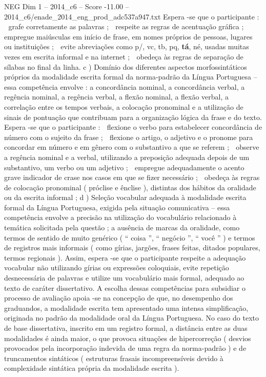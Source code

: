 \begin{textsample}{NEG Dim 1 – 2014\_c6 – Score -11.00 – 2014\_c6/enade\_2014\_eng\_prod\_adc537a947.txt}
Espera -se que o participante :  grafe corretamente as palavras ;  respeite as regras de acentuação gráfica ;  empregue maiúsculas em início de frase, em nomes próprios de pessoas, lugares ou instituições ;  evite abreviações como p/, vc, tb, pq, \textbf{tá}, né, usadas muitas vezes em escrita informal e na internet ;  obedeça às regras de separação de sílabas no final da linha. c ) Domínio dos diferentes aspectos morfossintáticos próprios da modalidade escrita formal da norma-padrão da Língua Portuguesa – essa competência envolve : a concordância nominal, a concordância verbal, a regência nominal, a regência verbal, a flexão nominal, a flexão verbal, a correlação entre os tempos verbais, a colocação pronominal e a utilização de sinais de pontuação que contribuam para a organização lógica da frase e do texto.
Espera -se que o participante :  flexione o verbo para estabelecer concordância de número com o sujeito da frase ;  flexione o artigo, o adjetivo e o pronome para concordar em número e em gênero com o substantivo a que se referem ;  observe a regência nominal e a verbal, utilizando a preposição adequada depois de um substantivo, um verbo ou um adjetivo ;  empregue adequadamente o acento grave indicador de crase nos casos em que se fizer necessário ;  obedeça às regras de colocação pronominal ( próclise e ênclise ), distintas dos hábitos da oralidade ou da escrita informal ; d ) Seleção vocabular adequada à modalidade escrita formal da Língua Portuguesa, exigida pela situação comunicativa – essa competência envolve a precisão na utilização do vocabulário relacionado à temática solicitada pela questão ; a ausência de marcas da oralidade, como termos de sentido de muito genérico ( “ coisa ”, “ negócio ”, “ você ” ) e termos de registros mais informais ( como gírias, jargões, frases feitas, ditados populares, termos regionais ).
Assim, espera -se que o participante respeite a adequação vocabular não utilizando gírias ou expressões coloquiais, evite repetição desnecessária de palavras e utilize um vocabulário mais formal, adequado ao texto de caráter dissertativo.
A escolha dessas competências para subsidiar o processo de avaliação apoia -se na concepção de que, no desempenho dos graduandos, a modalidade escrita tem apresentado uma intensa simplificação, originada no padrão da modalidade oral da Língua Portuguesa.
No caso do texto de base dissertativa, inscrito em um registro formal, a distância entre as duas modalidades é ainda maior, o que provoca situações de hipercorreção ( desvios provocados pela incorporação indevida de uma regra da norma-padrão ) e de truncamentos sintáticos ( estruturas frasais incompreensíveis devido à complexidade sintática própria da modalidade escrita ).

\end{textsample}
